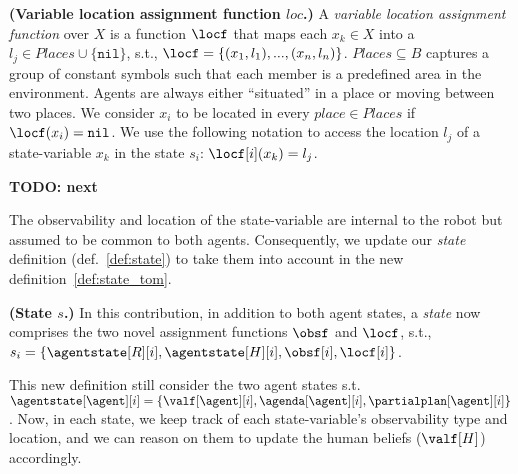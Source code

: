 \begin{definition}
    \textbf{(Variable location assignment function $loc$.)} A \emph{variable location assignment function} over $X$ is a function $\locf$ that maps each $x_k \in X$ into a $l_j \in Places \cup \{ \texttt{nil} \}$, s.t., $\locf = \{ (x_1,l_1), ..., (x_n,l_n) \}$. 
    $Places \subseteq B$ captures a group of constant symbols such that each member is a predefined area in the environment. 
    Agents are always either ``situated'' in a place or moving between two places. 
    We consider $x_i$ to be located in every $place \in Places$ if $\locf(x_i)=\texttt{nil}$. 
    We use the following notation to access the location $l_j$ of a state-variable $x_k$ in the state $s_i$: $\locf[i](x_k) = l_j$.
    \label{def:variable_location_assignment_function}
\end{definition}


\textbf{TODO: next}

The observability and location of the state-variable are internal to the robot but assumed to be common to both agents. Consequently, we update our \textit{state} definition (def.~\ref{def:state}) to take them into account in the new definition~\ref{def:state_tom}.

\begin{definition}
    \textbf{(State $s$.)} In this contribution, in addition to both agent states, a \emph{state} now comprises the two novel assignment functions $\obsf$ and $\locf$, s.t., $s_i = \{ \agentstate[R][i], \agentstate[H][i], \obsf[i], \locf[i] \}$.
    \label{def:state_tom}
\end{definition}

This new definition still consider the two agent states s.t. $\agentstate[\agent][i] = \{ \valf[\agent][i], \agenda[\agent][i], \partialplan[\agent][i] \}$. Now, in each state, we keep track of each state-variable's observability type and location, and we can reason on them to update the human beliefs ($\valf[H]$) accordingly. 

